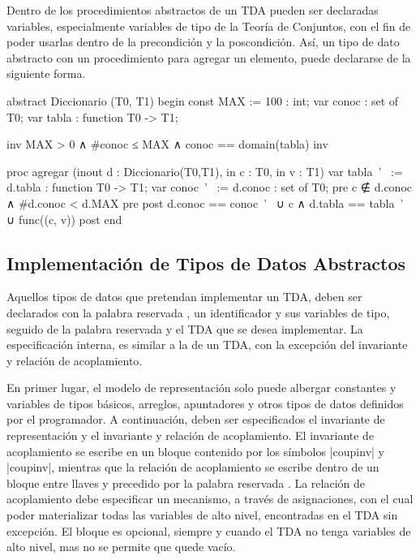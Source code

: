 Dentro de los procedimientos abstractos de un TDA pueden ser declaradas
variables, especialmente variables de tipo de la Teoría de Conjuntos, con el
fin de poder usarlas dentro de la precondición y la poscondición. Así, un tipo
de dato abstracto  con un procedimiento para agregar un
elemento, puede declararse de la siguiente forma.

\begin{gracielacode}
abstract Diccionario (T0, T1) begin
  const MAX := 100 : int;
  var   conoc      : set of T0;
  var   tabla      : function T0 -> T1;

  {inv MAX > 0 ∧ #conoc ≤ MAX ∧ conoc == domain(tabla) inv}

  proc agregar (inout d : Diccionario(T0,T1), in c : T0, in v : T1)
  	var tabla~'~ := d.tabla : function T0 -> T1;
    var conoc~'~ := d.conoc : set of T0;
    {pre c ∉ d.conoc ∧ #d.conoc < d.MAX pre}
    {post d.conoc == conoc~'~ ∪ {c}
        ∧ d.tabla == tabla~'~ ∪ func({(c, v)}) post}
end
\end{gracielacode}

\subsection{Implementación de Tipos de Datos Abstractos}

Aquellos tipos de datos que pretendan implementar un TDA, deben ser declarados
con la palabra reservada , un identificador y sus variables de
tipo, seguido de la palabra reservada  y el TDA que se
desea implementar. La especificación interna, es similar a la de un TDA, con la
excepción del invariante y relación de acoplamiento.

En primer lugar, el modelo de representación solo puede albergar constantes y
variables de tipos básicos, arreglos, apuntadores y otros tipos de datos
definidos por el programador. A continuación, deben ser especificados el
invariante de representación y el invariante y relación de acoplamiento. El
invariante de acoplamiento se escribe en un bloque contenido por los símbolos
\ingra|{coupinv| y \ingra|coupinv}|, mientras que la relación de
acoplamiento se escribe dentro de un bloque entre llaves y precedido por la
palabra reservada . La relación de acoplamiento debe especificar
un mecanismo, a través de asignaciones, con el cual poder materializar todas
las variables de alto nivel, encontradas en el TDA sin excepción. El bloque
 es opcional, siempre y cuando el TDA no tenga variables de alto
nivel, mas no se permite que quede vacío.

